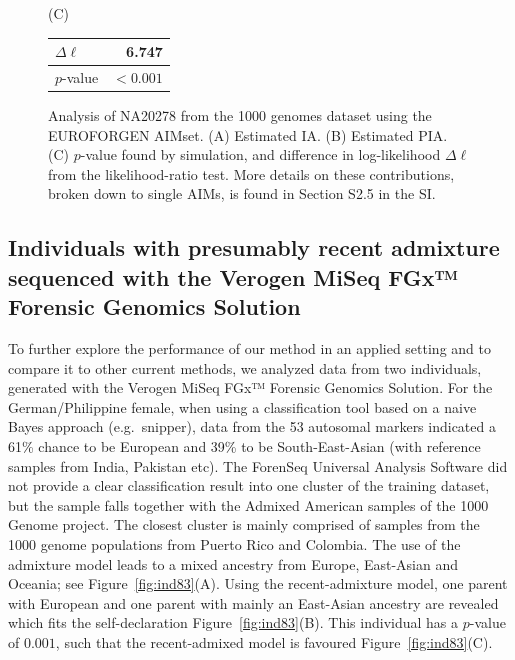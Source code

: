 \documentclass[12pt]{article}
\theoremstyle{definition}
\begin{document}
\begin{figure}[!htb]
  \vspace{0.5cm}
  
  (C) \hspace{3cm}

{\color{blue}
\begin{tabular}{|l|r|}\hline
$\Delta\ell$ & 6.747 \\ \hline
$p$-value & $<0.001$ \\ \hline
\end{tabular}}

  \caption{\label{fig:NA20278EUROFORGEN} Analysis of NA20278 from the 1000 genomes dataset using the EUROFORGEN AIMset. (A) Estimated IA. (B) Estimated PIA. (C) {\color{blue}$p$-value found by simulation, and} difference in log-likelihood $\Delta\ell$ from the likelihood-ratio test. More details on these contributions, broken down to single AIMs, is found in Section S2.5 in the SI.}
\end{figure}

\subsection{Individuals with {\color{blue}presumably} recent admixture sequenced with the Verogen MiSeq FGx™ Forensic Genomics Solution}
{\color{blue}To further explore the performance of our method in an applied setting and to compare it to other current methods, we analyzed data from two individuals, generated with the Verogen MiSeq FGx™ Forensic Genomics Solution.} For the German/Philippine female, when using a classification tool based on a naive Bayes approach (e.g.\ {\sc snipper}), data from the 53 autosomal markers indicated a 61\% chance to be European and 39\% to be South-East-Asian (with reference samples from India, Pakistan etc). The ForenSeq Universal Analysis Software did not provide a clear classification result into one cluster of the training dataset, but the sample falls together with the Admixed American samples of the 1000 Genome project. The closest cluster is mainly comprised of samples from the 1000 genome populations from Puerto Rico and Colombia. The use of the admixture model leads to a mixed ancestry from Europe, East-Asian and Oceania; see Figure~\ref{fig:ind83}(A). Using the recent-admixture model, one parent with European and one parent with mainly an East-Asian ancestry are revealed which fits the self-declaration Figure~\ref{fig:ind83}(B). This individual has a $p$-value of $0.001$, such that the recent-admixed model is favoured Figure~\ref{fig:ind83}(C).
\end{document}
